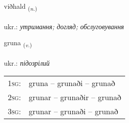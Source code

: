 \documentclass[frontgrid, backgrid]{flacards}\usepackage[]{graphicx}\usepackage[]{xcolor}
\begin{document}
\renewcommand{\flhead}{\vskip5pt \fboxsep=0pt {\small\bfseries\footnotesize Nafnorð | іменник}}
\renewcommand{\fcfoot}{\vskip5pt \fboxsep=0pt \hspace{2pt}{\small\bfseries\footnotesize 3K}}

\renewcommand{\blhead}{\vskip5pt {\small\bfseries\footnotesize Nafnorð | іменник }}
\renewcommand{\bcfoot}{\vskip5pt \hspace{2pt}{\small\bfseries\footnotesize 3K}}


{viðhald \small{\textsubscript{(\textit{n.})}} \\[1ex] %
\textphonetic{[vɪθhalt]} \\
ukr.: \emph{утримання; догляд; обслуговування} \\  [2ex]
\renewcommand*{\arraystretch}{0.8}
}

\renewcommand{\flhead}{\vskip5pt \fboxsep=0pt {\small\bfseries\footnotesize Sagnorð | дієслово}}
\renewcommand{\fcfoot}{\vskip5pt \fboxsep=0pt \hspace{2pt}{\small\bfseries\footnotesize 3K}}

\renewcommand{\blhead}{\vskip5pt {\small\bfseries\footnotesize Sagnorð | дієслово }}
\renewcommand{\bcfoot}{\vskip5pt \hspace{2pt}{\small\bfseries\footnotesize 3K}}


{gruna \small{\textsubscript{(\textit{v.})}} \\[1ex] %
\textphonetic{[krʏːna]} \\
ukr.: \emph{підозрілий} \\  [2ex]
\renewcommand*{\arraystretch}{0.8}
\begin{tabular}{p{1cm}l}
\textsc{1sg}: & gruna -- grunaði -- grunað \\ 
\textsc{2sg}: & grunar -- grunaðir -- grunað \\ 
\textsc{3sg}: & grunar -- grunaði -- grunað \\ 
\end{tabular}
}
\end{document}
